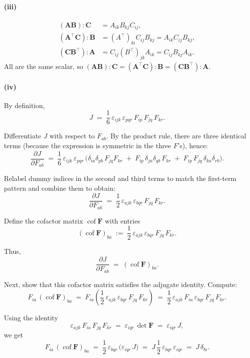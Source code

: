 \paragraph{(iii)}
\begin{align*}
(\bm{A}\bm{B}):\bm{C} &= A_{ik}B_{kj}C_{ij}, \\
(\bm{A}^\top \bm{C}):\bm{B} &= (A^\top)_{ki}C_{ij}B_{kj} = A_{ik}C_{ij}B_{kj}, \\
(\bm{C}\bm{B}^\top):\bm{A} &= C_{ij}(B^\top)_{jk}A_{ik} = C_{ij}B_{kj}A_{ik}.
\end{align*}
All are the same scalar, so
$(\bm{A}\bm{B}):\bm{C}=(\bm{A}^\top \bm{C}):\bm{B}=(\bm{C}\bm{B}^\top):\bm{A}$.

\paragraph{(iv)}
By definition,
$$
J \;=\; \frac{1}{6}\,\varepsilon_{ijk}\,\varepsilon_{pqr}\,F_{ip}\,F_{jq}\,F_{kr}.
$$

Differentiate $J$ with respect to $F_{ab}$. By the product rule, there are three identical terms (because the expression is symmetric in the three $F$'s), hence:
$$
\frac{\partial J}{\partial F_{ab}}
\;=\;
\frac{1}{6}\,\varepsilon_{ijk}\,\varepsilon_{pqr}\,
\Big(\delta_{ia}\delta_{pb}\,F_{jq}F_{kr}
\;+\;
F_{ip}\,\delta_{ja}\delta_{qb}\,F_{kr}
\;+\;
F_{ip}\,F_{jq}\,\delta_{ka}\delta_{rb}\Big).
$$

Relabel dummy indices in the second and third terms to match the first-term pattern and combine them to obtain:
$$
\frac{\partial J}{\partial F_{ab}}
\;=\;
\frac{1}{2}\,\varepsilon_{a j k}\,\varepsilon_{b q r}\,F_{jq}\,F_{kr}.
$$

Define the cofactor matrix $\operatorname{cof}\bm{F}$ with entries
$$
(\operatorname{cof}\bm{F})_{ba}
\;:=\;
\frac{1}{2}\,\varepsilon_{a j k}\,\varepsilon_{b q r}\,F_{jq}\,F_{kr}.
$$

Thus,
$$
\frac{\partial J}{\partial F_{ab}}
\;=\;
(\operatorname{cof}\bm{F})_{ba}.
$$

Next, show that this cofactor matrix satisfies the adjugate identity. Compute:
$$
F_{ia}\,(\operatorname{cof}\bm{F})_{ba}
\;=\;
F_{ia}\left(\frac{1}{2}\,\varepsilon_{a j k}\,\varepsilon_{b q r}\,F_{jq}\,F_{kr}\right)
\;=\;
\frac{1}{2}\,\varepsilon_{a j k}\,F_{ia}\,\varepsilon_{b q r}\,F_{jq}\,F_{kr}.
$$

Using the identity
$$
\varepsilon_{a j k}\,F_{ia}\,F_{jq}\,F_{kr}
\;=\;
\varepsilon_{i q r}\,\det\bm{F}
\;=\;
\varepsilon_{i q r}\,J,
$$
we get
$$
F_{ia}\,(\operatorname{cof}\bm{F})_{ba}
\;=\;
\frac{1}{2}\,\varepsilon_{b q r}\,\big(\varepsilon_{i q r}\,J\big)
\;=\;
J\,\frac{1}{2}\,\varepsilon_{b q r}\,\varepsilon_{i q r}
\;=\;
J\,\delta_{bi}.
$$

